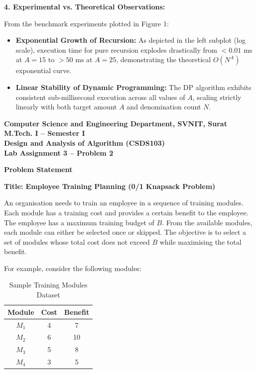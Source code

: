 \documentclass[12pt]{article}
\begin{document}
\textbf{4. Experimental vs. Theoretical Observations:}

From the benchmark experiments plotted in Figure 1:
\begin{itemize}
    \item \textbf{Exponential Growth of Recursion:} As depicted in the left subplot (log scale), execution time for pure recursion explodes drastically from $<0.01\text{ ms}$ at $A=15$ to $>50\text{ ms}$ at $A=25$, demonstrating the theoretical $O(N^A)$ exponential curve.
    \item \textbf{Linear Stability of Dynamic Programming:} The DP algorithm exhibits consistent sub-millisecond execution across all values of $A$, scaling strictly linearly with both target amount $A$ and denomination count $N$.
\end{itemize}

\newpage


\begin{center}
\textbf{Computer Science and Engineering Department, SVNIT, Surat}\\
\textbf{M.Tech. I -- Semester I}\\
\textbf{Design and Analysis of Algorithm (CSDS103)}\\
\textbf{Lab Assignment 3 -- Problem 2}
\end{center}

\vspace{0.4cm}

\textbf{Problem Statement}

\textbf{Title: Employee Training Planning (0/1 Knapsack Problem)}

An organisation needs to train an employee in a sequence of training modules. Each module has a training cost and provides a certain benefit to the employee.
The employee has a maximum training budget of $B$. From the available modules, each module can either be selected once or skipped. The objective is to select a set of modules whose total cost does not exceed $B$ while maximising the total benefit.

For example, consider the following modules:

\begin{table}[H]
\centering
\begin{tabular}{|c|c|c|}
\hline
\textbf{Module} & \textbf{Cost} & \textbf{Benefit} \\
\hline
$M_1$ & 4 & 7 \\
$M_2$ & 6 & 10 \\
$M_3$ & 5 & 8 \\
$M_4$ & 3 & 5 \\
\hline
\end{tabular}
\caption{Sample Training Modules Dataset}
\end{table}
\end{document}
